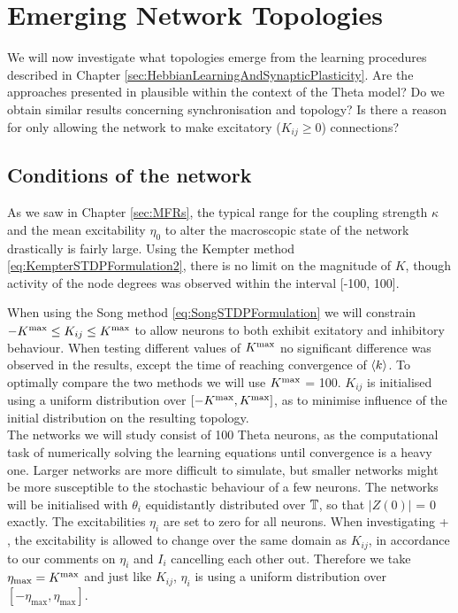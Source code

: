 \newpage
\section{\mywork Emerging Network Topologies}

We will now investigate what topologies emerge from the learning procedures described in Chapter \ref{sec:HebbianLearningAndSynapticPlasticity}. Are the approaches presented in \cite{Kempter1999, Song2000, Song2017, ChrolCannon2012} plausible within the context of the Theta model? Do we obtain similar results concerning synchronisation and topology? Is there a reason for only allowing the network to make excitatory ($K_{ij} \geq 0$) connections? 

\subsection{Conditions of the network}
As we saw in Chapter \ref{sec:MFRs}, the typical range for the coupling strength $\kappa$ and the mean excitability $\eta_0$ to alter the macroscopic state of the network drastically is fairly large. Using the Kempter method \eqref{eq:KempterSTDPFormulation2}, there is no limit on the magnitude of $K$, though activity of the node degrees was observed within the interval [-100, 100]. 

When using the Song method \eqref{eq:SongSTDPFormulation} we will constrain $-K^{\rm max} \leq K_{ij} \leq K^{\rm max}$ to allow neurons to both exhibit exitatory and inhibitory behaviour. When testing different values of $K^{\rm max}$ no significant difference was observed in the results, except the time of reaching convergence of ${\langle k\rangle}$. To optimally compare the two methods we will use $K^{\rm max}$ = 100. $K_{ij}$ is initialised using a uniform distribution over $[-K^{\rm max}, K^{\rm max}]$, as to minimise influence of the initial distribution on the resulting topology.\\

The networks we will study consist of 100 Theta neurons, as the computational task of numerically solving the learning equations until convergence is a heavy one. Larger networks are more difficult to simulate, but smaller networks might be more susceptible to the stochastic behaviour of a few neurons. The networks will be initialised with $\theta_i$ equidistantly distributed over ${\mathbb{T}}$, so that $| Z(0) |$ = 0 exactly. The excitabilities $\eta_i$ are set to zero for all neurons. 
When investigating \STDP + \IP, the excitability is allowed to change over the same domain as $K_{ij}$, in accordance to our comments on $\eta_i$ and $I_i$ cancelling each other out. Therefore we take $\eta_{\max} = K^{\rm max}$ and just like $K_{ij}$, $\eta_i$ is using a uniform distribution over $[-\eta_{\max}, \eta_{\max}]$.


